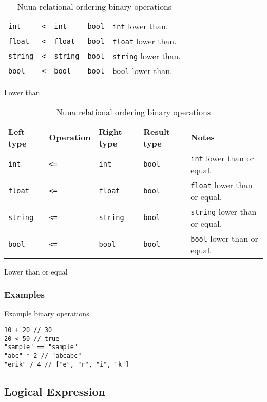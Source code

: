 \begin{table}[H]
\begin{subtable}{\textwidth}
\begin{tabular}{ l l l l p{9.5cm} }
            \texttt{int} & \texttt{<} & \texttt{int} & \texttt{bool} & \texttt{int} lower than.\\
            \texttt{float} & \texttt{<} & \texttt{float} & \texttt{bool} & \texttt{float} lower than.\\
            \texttt{string} & \texttt{<} & \texttt{string} & \texttt{bool} & \texttt{string} lower than.\\
            \texttt{bool} & \texttt{<} & \texttt{bool} & \texttt{bool} & \texttt{bool} lower than.\\
        \end{tabular}
        \caption{Lower than}
    \end{subtable}
    \begin{subtable}{\textwidth}
        \centering
        \begin{tabular}{ l l l l p{9.5cm} }
            \textbf{Left type} & \textbf{Operation} & \textbf{Right type} & \textbf{Result type} & \textbf{Notes} \\
            \texttt{int} & \texttt{<=} & \texttt{int} & \texttt{bool} & \texttt{int} lower than or equal.\\
            \texttt{float} & \texttt{<=} & \texttt{float} & \texttt{bool} & \texttt{float} lower than or equal.\\
            \texttt{string} & \texttt{<=} & \texttt{string} & \texttt{bool} & \texttt{string} lower than or equal.\\
            \texttt{bool} & \texttt{<=} & \texttt{bool} & \texttt{bool} & \texttt{bool} lower than or equal.\\
        \end{tabular}
        \caption{Lower than or equal}
    \end{subtable}
    \caption{Nuua relational ordering binary operations}
    \label{fig:nuua_relational_ordering_bin_ops}
\end{table}
\clearpage
\subsubsection{Examples}

Example binary operations.
\begin{verbatim}
10 + 20 // 30
20 < 50 // true
"sample" == "sample"
"abc" * 2 // "abcabc"
"erik" / 4 // ["e", "r", "i", "k"]
\end{verbatim}

\subsection{Logical Expression}

